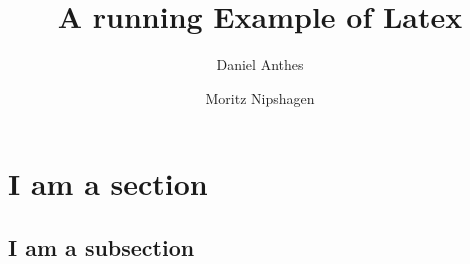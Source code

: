 \documentclass[12pt]{scrarticle}
\title{A running Example of Latex}
\author{Daniel Anthes \and Moritz Nipshagen}
\date{} %
\begin{document}
\maketitle

\begin{abstract}
    \lipsum[3]
\end{abstract}

\section{I am a section}

\lipsum[1]

\subsection{I am a subsection}

\lipsum[2]
\end{document}
